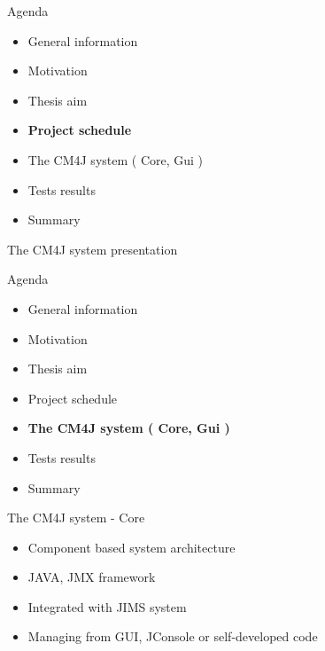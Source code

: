 \documentclass{beamer}
\begin{document}
	\begin{frame}{Agenda}

		\begin{itemize}
			\item General information
			\item Motivation
			\item Thesis aim
			\item \textbf{Project schedule}
			\item The CM4J system ( Core, Gui )
			\item Tests results
			\item Summary
		\end{itemize}

	\end{frame}

	\begin{frame}{The CM4J system presentation}


	\end{frame}

	\begin{frame}{Agenda}

		\begin{itemize}
			\item General information
			\item Motivation
			\item Thesis aim
			\item Project schedule
			\item \textbf{The CM4J system ( Core, Gui )}
			\item Tests results
			\item Summary
		\end{itemize}

	\end{frame}

	\begin{frame}{The CM4J system - Core}

		\begin{itemize}
			\item Component based system architecture
			\item JAVA, JMX framework
			\item Integrated with JIMS system
			\item Managing from GUI, JConsole or self-developed code
		\end{itemize}

	\end{frame}
\end{document}

